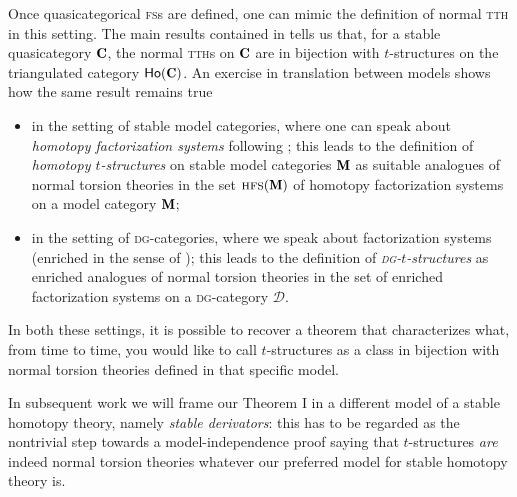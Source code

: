 Once quasicategorical \textsc{fs}s are defined, one can mimic the definition of normal \textsc{tth} in this setting. The main results contained in \cite{tstructures} tells us that, for a stable quasicategory $\C$, the normal \textsc{tth}s on $\C$ are in bijection with $t$-structures on the triangulated category $\ho(\C)$.
An exercise in translation between models shows how the same result remains true
\begin{itemize}
\item in the setting of stable model categories, where one can speak about \emph{homotopy factorization systems} following \cite{bousfield1977constructions,Joy}; this leads to the definition of  \emph{homotopy $t$\hyp{}structures} on stable model categories $\cate{M}$ as suitable analogues of normal torsion theories in the set $\textsc{hfs}(\cate{M})$ of homotopy factorization systems on a model category $\cate{M}$;
\item in the setting of \textsc{dg}\hyp{}categories, where we speak about factorization systems (enriched in the sense of \cite{Day1974,enrichFS}); this leads to the definition of \emph{\textsc{dg}\hyp{}$t$\hyp{}structures} as enriched analogues of normal torsion theories in the set of enriched factorization systems on a \textsc{dg}\hyp{}category $\mathcal D$.
\end{itemize}
In both these settings, it is possible to recover a theorem that characterizes what, from time to time, you would like to call $t$-structures as a class in bijection with normal torsion theories defined in that specific model.

In subsequent work \cite{new_fs_on_derivator} we will frame our Theorem I in a different model of a stable homotopy theory, namely \emph{stable derivators}: this has to be regarded as the nontrivial step towards a model\hyp{}independence proof saying that $t$-structures \emph{are} indeed normal torsion theories whatever our preferred model for stable homotopy theory is.

